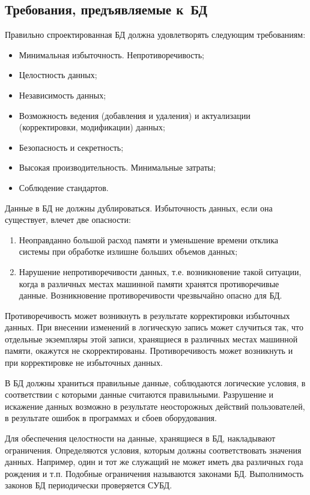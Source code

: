 \documentclass{ou}
\begin{document}
\subsection{Требования, предъявляемые к~БД}
Правильно спроектированная БД должна удовлетворять следующим требованиям:
\begin{itemize}[label=-, leftmargin=0em, itemindent=3.35em, nosep]
\item Минимальная избыточность. Непротиворечивость;
\item Целостность данных;
\item Независимость данных;
\item Возможность ведения (добавления и удаления) и актуализации (корректировки, модификации) данных;
\item Безопасность и секретность;
\item Высокая производительность. Минимальные затраты;
\item Соблюдение стандартов\cite{Karpova2013}.
\end{itemize}

Данные в БД не должны дублироваться. Избыточность данных, если она существует, влечет две опасности: 
\begin{enumerate}[leftmargin=0em, itemindent=3.75em, nosep, label=\arabic*)]
\item Неоправданно большой расход памяти и уменьшение времени отклика системы при обработке излишне больших объемов данных;
\item Нарушение непротиворечивости данных, т.е. возникновение такой ситуации, когда в различных местах машинной памяти хранятся противоречивые данные. Возникновение противоречивости чрезвычайно опасно для БД.
\end{enumerate}

Противоречивость может возникнуть в результате корректировки избыточных данных. При внесении изменений в логическую запись может случиться так, что отдельные экземпляры этой записи, хранящиеся в различных местах машинной памяти, окажутся не скорректированы. Противоречивость может возникнуть и при корректировке не избыточных данных\cite{Senchenko2015}.

В БД должны храниться правильные данные, соблюдаются логические условия, в соответствии с которыми данные считаются правильными. Разрушение и искажение данных возможно в результате неосторожных действий пользователей, в результате ошибок в программах и сбоев оборудования. 

Для обеспечения целостности на данные, хранящиеся в БД, накладывают ограничения. Определяются условия, которым должны соответствовать значения данных. Например, один и тот же служащий не может иметь два различных года рождения и т.п. Подобные ограничения называются законами БД. Выполнимость законов БД периодически проверяется СУБД\cite{Sergeev2012}. 
\end{document}
